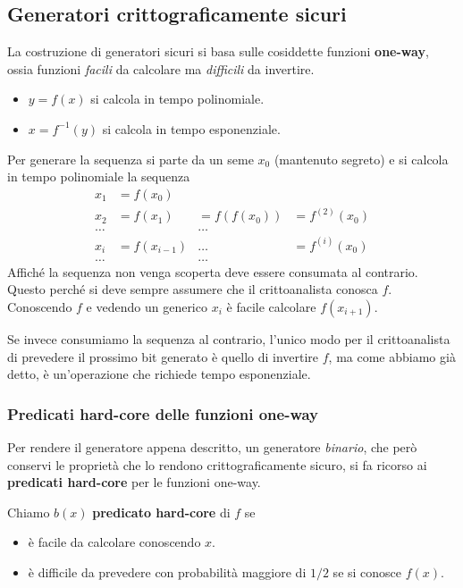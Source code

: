 \subsection{Generatori crittograficamente sicuri}
La costruzione di generatori sicuri si basa sulle cosiddette funzioni \textbf{one-way}, ossia funzioni \emph{facili} da
calcolare ma \emph{difficili} da invertire.
\begin{itemize}
	\item $y = f(x)$ si calcola in tempo polinomiale.
	\item $x = f^{-1}(y)$ si calcola in tempo esponenziale.
\end{itemize}
Per generare la sequenza si parte da un seme $x_0$ (mantenuto segreto) e si calcola in tempo polinomiale la sequenza
\[
	\begin{matrix}
		x_1   & = f(x_0)     &             &                \\
		x_2   & = f(x_1)     & = f(f(x_0)) & = f^{(2)}(x_0) \\
		\dots &              & \dots       &                \\
		x_i   & = f(x_{i-1}) & \dots       & = f^{(i)}(x_0) \\
		\dots &              & \dots       &
	\end{matrix}
\]
Affich\'e la sequenza non venga scoperta deve essere consumata al contrario. Questo perch\'e si deve sempre assumere
che il crittoanalista conosca $f$. Conoscendo $f$ e vedendo un generico $x_i$ \`e facile calcolare $f(x_{i+1})$.

Se invece consumiamo la sequenza al contrario, l'unico modo per il crittoanalista di prevedere il prossimo bit generato
\`e quello di invertire $f$, ma come abbiamo gi\`a detto, \`e un'operazione che richiede tempo esponenziale.

\subsubsection{Predicati hard-core delle funzioni one-way}
Per rendere il generatore appena descritto, un generatore \emph{binario}, che per\`o conservi le propriet\`a che lo
rendono crittograficamente sicuro, si fa ricorso ai \textbf{predicati hard-core} per le funzioni one-way.
\begin{definition}
	Chiamo $b(x)$ \textbf{predicato hard-core} di $f$ se
	\begin{itemize}
		\item \`e facile da calcolare conoscendo $x$.
		\item \`e difficile da prevedere con probabilit\`a maggiore di $1/2$ se si conosce $f(x)$.
	\end{itemize}
\end{definition}

